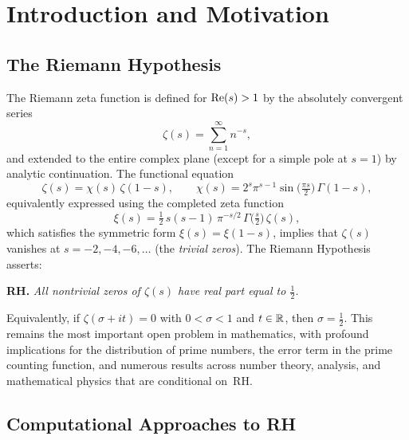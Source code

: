 \section{Introduction and Motivation}
\label{sec:intro}

\subsection{The Riemann Hypothesis}
\label{sec:rh}

The Riemann zeta function is defined for $\operatorname{Re}(s) > 1$ by the absolutely convergent
series
\begin{equation}\label{eq:zeta-def}
  \zeta(s) = \sum_{n=1}^{\infty} n^{-s},
\end{equation}
and extended to the entire complex plane (except for a simple pole at $s=1$) by
analytic continuation. The functional equation
\begin{equation}\label{eq:func-eq}
  \zeta(s) = \chi(s)\,\zeta(1-s),
  \qquad
  \chi(s) = 2^s \pi^{s-1} \sin\!\bigl(\tfrac{\pi s}{2}\bigr)\,\Gamma(1-s),
\end{equation}
equivalently expressed using the completed zeta function
\begin{equation}\label{eq:xi-def}
  \xi(s) = \tfrac{1}{2}\,s(s-1)\,\pi^{-s/2}\,\Gamma\!\bigl(\tfrac{s}{2}\bigr)\,\zeta(s),
\end{equation}
which satisfies the symmetric form $\xi(s) = \xi(1-s)$, implies that $\zeta(s)$ vanishes
at $s = -2, -4, -6, \ldots$ (the \emph{trivial zeros}). The Riemann
Hypothesis~\cite{riemann1859} asserts:

\medskip
\noindent\textbf{RH.} \emph{All nontrivial zeros of $\zeta(s)$ have real part equal
to $\tfrac{1}{2}$.}
\medskip

\noindent
Equivalently, if $\zeta(\sigma + it) = 0$ with $0 < \sigma < 1$ and $t \in \mathbb{R}$, then
$\sigma = \tfrac{1}{2}$. This remains the most important open problem in mathematics,
with profound implications for the distribution of prime numbers, the error term in the
prime counting function, and numerous results across number theory, analysis, and
mathematical physics that are conditional on~RH.

\subsection{Computational Approaches to RH}
\label{sec:computational}

